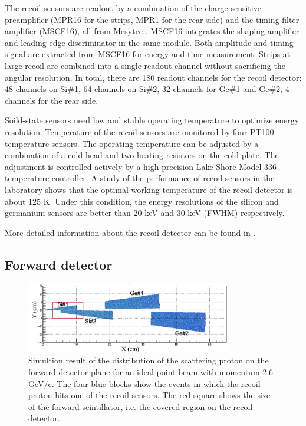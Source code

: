 \documentclass[number,5p]{elsarticle}
\begin{document}
The recoil sensors are readout by a combination of the charge-sensitive preamplifier (MPR16 for the strips, MPR1 for the rear side) 
and the timing filter amplifier (MSCF16), all from Mesytec \cite{mesytec}. 
MSCF16 integrates the shaping amplifier and leading-edge discriminator in the same module.
Both amplitude and timing signal are extracted from MSCF16 for energy and time measurement.
Strips at large recoil are combined into a single readout channel without sacrificing the angular resolution.
In total, there are 180 readout channels for the recoil detector: 
48 channels on Si\#1, 64 channels on Si\#2, 32 channels for Ge\#1 and Ge\#2, 4 channels for the rear side. 

Soild-state sensors need low and stable operating temperature to optimize energy
resolution.
Temperature of the recoil sensors are monitored by four PT100 temperature sensors.
The operating temperature can be adjusted by a combination of a cold head and two heating resistors on the cold plate.
The adjustment is controlled actively by a high-precision Lake Shore Model 336 temperature controller.
A study of the performance of recoil sensors in the laboratory shows that the
optimal working temperature of the recoil detector is about 125 K.
Under this condition, the energy resolutions of the silicon and germanium sensors are better than 20 keV and 30 keV (FWHM) respectively.

More detailed information about the recoil detector can be found in \cite{recoil_article}.

\subsection{Forward detector}
\label{sec:fwd}

\begin{figure}[htbp]
\centering
\includegraphics[width=0.8\textwidth]{./fwd_acceptance.png}
\caption{Simultion result of the distribution of the scattering proton on
  the forward detector plane for an ideal point beam with momentum 2.6 GeV/c.
  The four blue blocks show the events in which the recoil proton hits one of the recoil sensors.
  The red square shows the size of the forward scintillator, i.e. the covered
  region on the recoil detector.}
\label{fig:forward_acceptance}
\end{figure}
\end{document}
